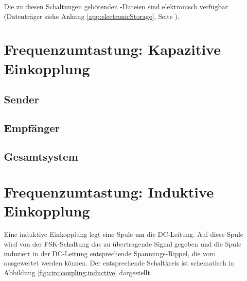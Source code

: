 Die zu  diesen Schaltungen geh\"orenden -Dateien  sind elektronisch
verf\"ugbar  (Datentr\"ager  siehe Anhang  \ref{app:electronicStorage},  Seite
\pageref{app:electronicStorage}).



\section{Frequenzumtastung: Kapazitive Einkopplung}
\label{sec:simu:fsk:capacitive}

\subsection{Sender}
\label{sec:simu:fsk:capacitive:transmitter}

\subsection{Empf\"anger}
\label{sec:simu:fsk:capacitive:receiver}

\subsection{Gesamtsystem}
\label{sec:simu:fsk:capacitive:system}

\section{Frequenzumtastung: Induktive Einkopplung}
\label{sec:simu:fsk:inductive}

Eine induktive Einkopplung legt eine  Spule um die DC-Leitung. Auf diese Spule
wird von der FSK-Schaltung das zu  \"ubertragende Signal gegeben und die Spule
induziert in  der DC-Leitung  entsprechende Spannungs-Rippel, die  vom \Master
ausgewertet werden k\"onnen. Der entsprechende  Schaltkreis ist schematisch in
Abbildung \ref{fig:circ:coupling:inductive} dargestellt.

